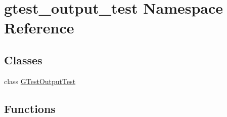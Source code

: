 \hypertarget{namespacegtest__output__test}{}\section{gtest\+\_\+output\+\_\+test Namespace Reference}
\label{namespacegtest__output__test}
\subsection*{Classes}
\begin{DoxyCompactItemize}
\item 
class \hyperlink{classgtest__output__test_1_1_g_test_output_test}{G\+Test\+Output\+Test}
\end{DoxyCompactItemize}
\subsection*{Functions}
